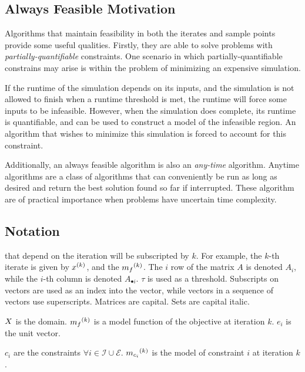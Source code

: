\subsection{Always Feasible Motivation}

Algorithms that maintain feasibility in both the iterates and sample points provide some useful qualities.
Firstly, they are able to solve problems with \emph{partially-quantifiable} constraints.
One scenario in which partially-quantifiable constrains may arise is within the problem of minimizing an expensive simulation.


If the runtime of the simulation depends on its inputs, and the simulation is not allowed to finish when a runtime threshold is met, the runtime will force some inputs to be infeasible.
However, when the simulation does complete, its runtime is quantifiable, and can be used to construct a model of the infeasible region.
An algorithm that wishes to minimize this simulation is forced to account for this constraint.


Additionally, an always feasible algorithm is also an \emph{any-time} algorithm.
Anytime algorithms are a class of algorithms that can conveniently be run as long as desired and return the best solution found so far if interrupted.
These algorithm are of practical importance when problems have uncertain time complexity.


\subsection{Notation}

 that depend on the iteration will be subscripted by $k$.
For example, the $k$-th iterate is given by ${x}^{(k)}$, and the ${{m}_f}^{(k)}$.
The $i$ row of the matrix $A$ is denoted $A_i$, while the $i$-th column is denoted $A_{\bullet i}$.
$\tau$ is used as a threshold.
Subscripts on vectors are used as an index into the vector, while vectors in a sequence of vectors use superscripts.
Matrices are capital.
Sets are capital italic.

$X$ is the domain.
${{m}_f}^{(k)}$ is a model function of the objective at iteration $k$.
$e_i$ is the unit vector.

$c_i$ are the constraints $\forall i \in \mathcal{I} \cup \mathcal{E} $.
${{m}_{c_i}}^{(k)}$ is the model of constraint $i$ at iteration $k$.

